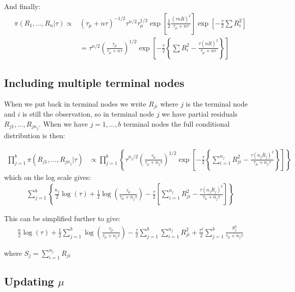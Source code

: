 \documentclass{article}
\begin{document}
And finally:
\begin{align*}
\pi(R_1, \ldots, R_n | \tau) \propto & (\tau_\mu + n \tau)^{-1/2} \tau^{n/2} \tau_\mu^{1/2} \exp \left[ \frac{1}{2} \frac{ (\tau n \bar{R})^2 }{ \tau_\mu + n \tau } \right] \exp \left[ -\frac{\tau}{2} \sum R_i^2 \right] \\
&= \tau^{n/2} \left( \frac{\tau_\mu}{\tau_\mu + n \tau} \right)^{1/2} \exp \left[ -\frac{\tau}{2} \left\{ \sum R_i^2 - \frac{ \tau (n\bar{R})^2 }{ \tau_\mu + n \tau } \right\} \right]
\end{align*}

\subsection*{Including multiple terminal nodes}

When we put back in terminal nodes we write $R_{ji}$ where $j$ is the terminal node and $i$ is still the observation, so in terminal node $j$ we have partial residuals $R_{j1}, \ldots, R_{jn_j}$. When we have $j=1,\ldots,b$ terminal nodes the full conditional distribution is then:

\begin{align*}
\prod_{j=1}^b \pi(R_{j1}, \ldots, R_{jn_j} | \tau) &\propto \prod_{j=1}^b \left\{ \tau^{n_j/2} \left( \frac{\tau_\mu}{\tau_\mu + n_j \tau} \right)^{1/2} \exp \left[ -\frac{\tau}{2} \left\{ \sum_{i=1}^{n_j} R_{ji}^2 - \frac{ \tau (n_j \bar{R}_j)^2 }{ \tau_\mu + n_j \tau } \right\} \right] \right\}
\end{align*}
which on the log scale gives:
\begin{align*}
\sum_{j=1}^b \left\{ \frac{n_j}{2} \log(\tau) + \frac{1}{2} \log \left( \frac{\tau_\mu}{\tau_\mu + n_j \tau} \right) - \frac{\tau}{2} \left[ \sum_{i=1}^{n_j} R_{ji}^2 - \frac{ \tau (n_j \bar{R}_j)^2 }{ \tau_\mu + n_j \tau } \right] \right\}
\end{align*}

This can be simplified further to give:
\begin{align*}
\frac{n}{2} \log(\tau) + \frac{1}{2} \sum_{j=1}^b \log \left( \frac{\tau_\mu}{\tau_\mu + n_j \tau} \right) - \frac{\tau}{2} \sum_{j=1}^b 
\sum_{i=1}^{n_j} R_{ji}^2 + \frac{\tau^2}{2} \sum_{j=1}^b \frac{ S_j^2 }{ \tau_\mu + n_j \tau }
\end{align*}

where $S_j = \sum_{i=1}^{n_j} R_{ji}$


\subsection*{Updating $\mu$}
\end{document}

